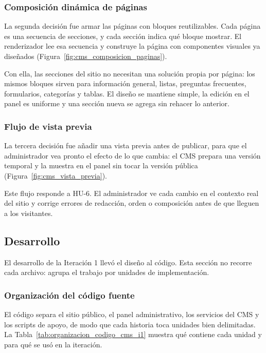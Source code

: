 \subsubsection{Composición dinámica de páginas}

La segunda decisión fue armar las páginas con bloques reutilizables. Cada página es una secuencia de secciones, y cada sección indica qué bloque mostrar. El renderizador lee esa secuencia y construye la página con componentes visuales ya diseñados (Figura~\ref{fig:cms_composicion_paginas}).



Con ella, las secciones del sitio no necesitan una solución propia por página: los mismos bloques sirven para información general, listas, preguntas frecuentes, formularios, categorías y tablas. El diseño se mantiene simple, la edición en el panel es uniforme y una sección nueva se agrega sin rehacer lo anterior.

\subsubsection{Flujo de vista previa}

La tercera decisión fue añadir una vista previa antes de publicar, para que el administrador vea pronto el efecto de lo que cambia: el CMS prepara una versión temporal y la muestra en el panel sin tocar la versión pública (Figura~\ref{fig:cms_vista_previa}).



Este flujo responde a HU-6. El administrador ve cada cambio en el contexto real del sitio y corrige errores de redacción, orden o composición antes de que lleguen a los visitantes.

\subsection{Desarrollo}

El desarrollo de la Iteración 1 llevó el diseño al código. Esta sección no recorre cada archivo: agrupa el trabajo por unidades de implementación.

\subsubsection{Organización del código fuente}

El código separa el sitio público, el panel administrativo, los servicios del CMS y los scripts de apoyo, de modo que cada historia toca unidades bien delimitadas. La Tabla~\ref{tab:organizacion_codigo_cms_i1} muestra qué contiene cada unidad y para qué se usó en la iteración.

